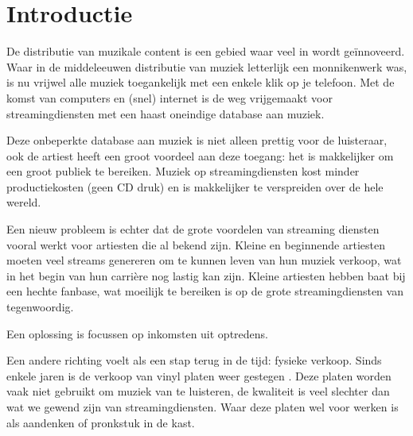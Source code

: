 \section{Introductie}

De distributie van muzikale content is een gebied waar veel in wordt geïnnoveerd. Waar in de middeleeuwen distributie van muziek letterlijk een monnikenwerk was, is nu vrijwel alle muziek toegankelijk met een enkele klik op je telefoon. Met de komst van computers en (snel) internet is de weg vrijgemaakt voor streamingdiensten met een haast oneindige database aan muziek.

Deze onbeperkte database aan muziek is niet alleen prettig voor de luisteraar, ook de artiest heeft een groot voordeel aan deze toegang: het is makkelijker om een groot publiek te bereiken. Muziek op streamingdiensten kost minder productiekosten (geen CD druk) en is makkelijker te verspreiden over de hele wereld.

Een nieuw probleem is echter dat de grote voordelen van streaming diensten vooral werkt voor artiesten die al bekend zijn. Kleine en beginnende artiesten moeten veel streams genereren om te kunnen leven van hun muziek verkoop, wat in het begin van hun carrière nog lastig kan zijn. Kleine artiesten hebben baat bij een hechte fanbase, wat moeilijk te bereiken is op de grote streamingdiensten van tegenwoordig.

Een oplossing is focussen op inkomsten uit optredens. 

Een andere richting voelt als een stap terug in de tijd: fysieke verkoop. Sinds enkele jaren is de verkoop van vinyl platen weer gestegen . Deze platen worden vaak niet gebruikt om muziek van te luisteren, de kwaliteit is veel slechter dan wat we gewend zijn van streamingdiensten. Waar deze platen wel voor werken is als aandenken of pronkstuk in de kast. 

